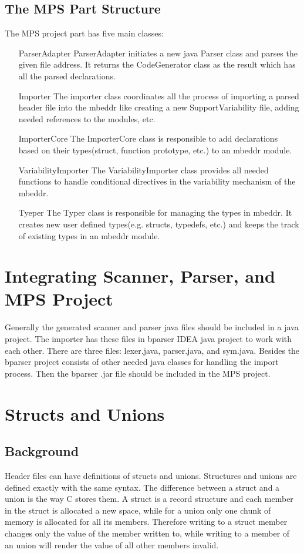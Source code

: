 \documentclass[titlepage]{article}
\begin{document}
\subsection{The MPS Part Structure}
The MPS project part has five main classes:
\begin{itemize}
\item[ParserAdapter] ParserAdapter initiates a new java Parser class and parses the given file address. It returns the CodeGenerator class as the result which has all the parsed declarations.
\item[Importer] The importer class coordinates all the process of importing a parsed header file into the mbeddr like creating a new SupportVariability file, adding needed references to the modules, etc.
\item[ImporterCore] The ImporterCore class is responsible to add declarations based on their types(struct, function prototype, etc.) to an mbeddr module.
\item[VariabilityImporter] The VariabilityImporter class provides all needed functions to handle conditional directives in the variability mechanism of the mbeddr.
\item[Tyeper] The Typer class is responsible for managing the types in mbeddr. It creates new user defined types(e.g. structs, typedefs, etc.) and keeps the track of existing types in an mbeddr module.
\end{itemize}


\section{Integrating Scanner, Parser, and MPS Project}
Generally the generated scanner and parser java files should be included in a java project. The importer has these files in bparser IDEA java project to work with each other. There are three files: lexer.java, parser.java, and sym.java. Besides the bparser project consists of other needed java classes for handling the import process. Then the bparser .jar file should be included in the MPS project.

\section{Structs and Unions}
\subsection{Background}
Header files can have definitions of structs and unions. Structures and unions are defined exactly with the same syntax. The difference between a struct and a union is the way C stores them. A struct is a record structure and each member in the struct is allocated a new space, while for a union only one chunk of memory is allocated for all its members. Therefore writing to a struct member changes only the value of the member written to, while writing to a member of an union will render the value of all other members invalid. 
\end{document}
